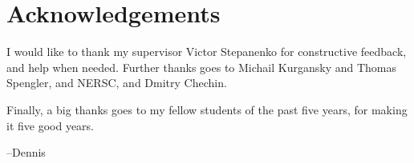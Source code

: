 \chapter*{Acknowledgements}

I would like to thank my supervisor Victor Stepanenko for constructive feedback, and help when needed.
Further thanks goes to Michail Kurgansky and Thomas Spengler, and NERSC, and Dmitry Chechin.

Finally, a big thanks goes to my fellow students of the past five years, for making it five good years.

\medskip\hfill --Dennis
